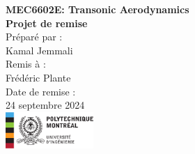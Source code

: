\documentclass[12pt]{article}
\begin{document}
\begin{titlepage}
    \centering
    \vspace*{5cm}
    
    {\Huge \textbf{MEC6602E: Transonic Aerodynamics}}\\[1.5cm]
    
    {\Large \textbf{Projet de remise}}\\[2cm]
    
    {\Large Préparé par :}\\
    {\Large Kamal Jemmali}\\[1.5cm]
    
    {\Large Remis à :}\\
    {\Large Frédéric Plante}\\[2cm]
    
    {\Large Date de remise :}\\
    {\Large 24 septembre 2024}\\
    
    \vfill
    \includegraphics[width=0.25\textwidth]{polytechnique-signature-rgb-gauche-fr.png} %
    
    \vfill
\end{titlepage}




\end{document}
